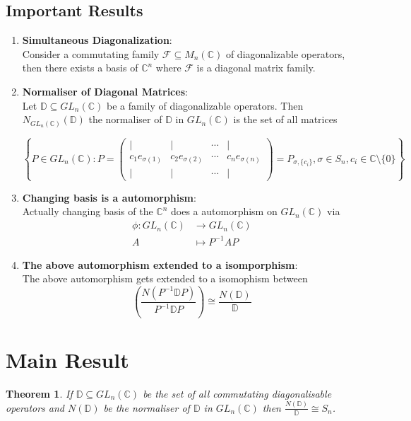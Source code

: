 \documentclass{article}
\newtheorem{theorem}{Theorem}
\theoremstyle{definition}
\theoremstyle{remark}
\begin{document}
\subsection{Important Results}
\begin{enumerate}
    \item \textbf{Simultaneous Diagonalization}:\\
    Consider a commutating family $\mathcal{F}\subseteq M_n(\mathbb{C})$ of diagonalizable operators, then there exists a basis of $\mathbb{C}^n$ where $\mathcal{F}$ is a diagonal matrix family.

    \item \textbf{Normaliser of Diagonal Matrices}:\\
    Let $\mathbb{D}\subseteq GL_n(\mathbb{C})$ be a family of diagonalizable operators. Then $N_{GL_n(\mathbb{C})}(\mathbb{D})$ the normaliser of $\mathbb{D}$ in $GL_n(\mathbb{C})$ is the set of all matrices 
    
    $$\left\{P\in GL_n(\mathbb{C}): P=
    \begin{pmatrix}
        |&|&\cdots&|\\
        c_1e_{\sigma(1)}&c_2e_{\sigma(2)}&\cdots&c_ne_{\sigma(n)}\\
        |&|&\cdots&|
    \end{pmatrix}=P_{\sigma,\{c_i\}}, \sigma \in S_n,c_i\in \mathbb{C}\setminus \{0\}
    \right\}$$

    \item \textbf{Changing basis is a automorphism}:\\
    Actually changing basis of the $\mathbb{C}^n$ does a automorphism on $GL_n(\mathbb{C})$ via 
    \[
\begin{aligned}
    \phi: GL_n(\mathbb{C}) &\to GL_n(\mathbb{C}) \\
    A &\mapsto P^{-1} A P
\end{aligned}
\]

\item \textbf{The above automorphism extended to a isomporphism}:\\
The above automorphism gets extended to a isomophism between 
\[
 \left( \frac{N(P^{-1}\mathbb{D}P) }{P^{-1}\mathbb{D}P } \right)\cong \frac{N(\mathbb{D})}{\mathbb{D}}
\]

\end{enumerate}

\newpage

\section{Main Result}
\begin{theorem}
    If $\mathbb{D}\subseteq GL_n(\mathbb{C})$ be the set of all commutating diagonalisable operators and $N(\mathbb{D})$ be the normaliser of $\mathbb{D}$ in $GL_n(\mathbb{C})$ then $\frac{N(\mathbb{D})}{\mathbb{D}}\cong S_n$.
    \end{theorem}
\end{document}
